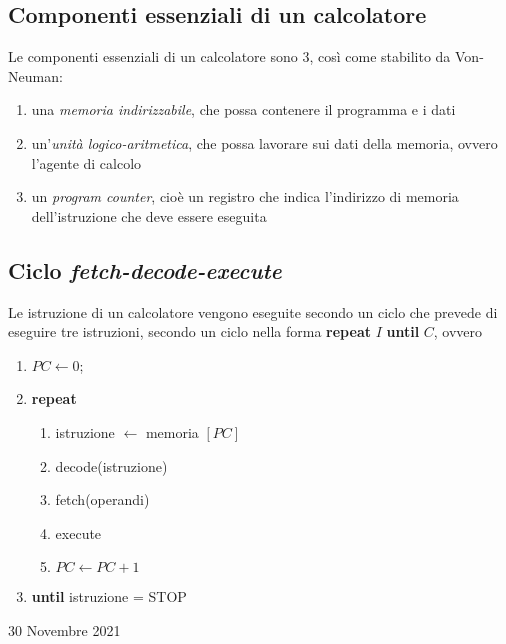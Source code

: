 \documentclass[a4paper]{extarticle}
\begin{document}
\vspace{1em}
\subsection{Componenti essenziali di un calcolatore}
Le componenti essenziali di un calcolatore sono \(3\), così come stabilito da Von-Neuman:
\begin{enumerate}
    \item una \textit{memoria indirizzabile}, che possa contenere il programma e i dati
    \item un'\textit{unità logico-aritmetica}, che possa lavorare sui dati della memoria, ovvero l'agente di calcolo
    \item un \textit{program counter}, cioè un registro che indica l'indirizzo di memoria dell'istruzione che deve essere eseguita
\end{enumerate}

\vspace{1em}
\noindent
\subsection{Ciclo \textit{fetch-decode-execute}}
Le istruzione di un calcolatore vengono eseguite secondo un ciclo che prevede di eseguire tre istruzioni, secondo un ciclo nella forma \textbf{repeat} \(I\) \textbf{until} \(C\), ovvero
\begin{enumerate}
    \item \(PC \leftarrow 0\);
    \item \textbf{repeat}
    \begin{enumerate}
        \item istruzione $\leftarrow$ memoria \([PC]\)
        \item decode(istruzione)
        \item fetch(operandi)
        \item execute
        \item \(PC \leftarrow PC + 1\)
    \end{enumerate}
    \item \textbf{until} istruzione  = STOP
\end{enumerate}

\newpage
\begin{center}
    30 Novembre 2021
\end{center}
\end{document}
